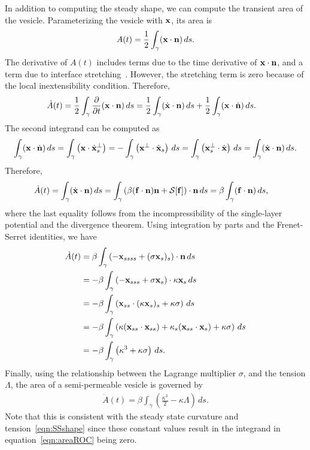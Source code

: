 \documentclass[aps,prl,showpacs]{revtex4}
\begin{document}
In addition to computing the steady shape, we can compute the transient
area of the vesicle. Parameterizing the vesicle with $\mathbf{x}$, its area is
\begin{align}
  A(t) = \frac{1}{2}\int_{\gamma} (\mathbf{x} \cdot \mathbf{n})\, ds .
\end{align}
The derivative of $A(t)$ includes terms due to the time derivative of
$\mathbf{x} \cdot \mathbf{n}$, and a term due to interface
stretching~\cite{lai-tse-hua2008}. However, the stretching term is zero
because of the local inextensibility condition. Therefore,
\begin{align}
  \dot{A}(t) &= \frac{1}{2} \int_{\gamma} \frac{\partial }{\partial t} 
    (\mathbf{x} \cdot \mathbf{n}) \, ds = 
  \frac{1}{2} \int_{\gamma} (\dot{\mathbf{x}} \cdot \mathbf{n})\, ds  + 
  \frac{1}{2} \int_{\gamma} (\mathbf{x} \cdot \dot{\mathbf{n}})\, ds.
\end{align}
The second integrand can be computed as
\begin{align}
  \int_\gamma (\mathbf{x} \cdot \dot{\mathbf{n}})\, ds 
    = \int_\gamma \left(\mathbf{x} \cdot \dot{\mathbf{x}}_s^\perp \right)
    = -\int_\gamma \left(\mathbf{x}^\perp \cdot \dot{\mathbf{x}}_s\right)\, ds 
    = \int_\gamma \left(\mathbf{x}_s^\perp \cdot \dot{\mathbf{x}}\right)\, ds 
    = \int_\gamma (\dot{\mathbf{x}} \cdot \mathbf{n})\, ds.
\end{align}
Therefore,
\begin{align}
  \dot{A}(t) &= \int_\gamma (\dot{\mathbf{x}} \cdot \mathbf{n})\, ds 
  = \int_\gamma \left(\beta (\mathbf{f} \cdot \mathbf{n})\mathbf{n} + \mathcal{S}[\mathbf{f}]\right) 
      \cdot \mathbf{n}\, ds 
  = \beta \int_\gamma (\mathbf{f} \cdot \mathbf{n})\, ds,
\end{align}
where the last equality follows from the incompressibility of the
single-layer potential and the divergence theorem.  Using integration by
parts and the Frenet-Serret identities, we have
\begin{align}
  \dot{A}(t) &= \beta \int_\gamma \left( -\mathbf{x}_{ssss} + 
    (\sigma \mathbf{x}_s)_s \right) \cdot \mathbf{n} \, ds \\
  &= -\beta \int_\gamma \left(-\mathbf{x}_{sss} + \sigma \mathbf{x}_s 
    \right) \cdot \kappa \mathbf{x}_s \, ds \\
  &= -\beta \int_\gamma \left(\mathbf{x}_{ss} \cdot 
    (\kappa \mathbf{x}_s)_s + \kappa \sigma \right) \, ds \\
  &= -\beta \int_\gamma \left(\kappa (\mathbf{x}_{ss} \cdot \mathbf{x}_{ss}) + 
    \kappa_s (\mathbf{x}_{ss} \cdot \mathbf{x}_s) + \kappa \sigma \right) 
    \, ds \\
  &= -\beta \int_\gamma \left(\kappa^3 + \kappa \sigma \right) 
    \, ds.
\end{align}
Finally, using the relationship between the Lagrange multiplier
$\sigma$, and the tension $\Lambda$, the area of a semi-permeable
vesicle is governed by
\begin{align}
  \dot{A}(t) = \beta \int_\gamma \left(
    \frac{\kappa^3}{2} - \kappa \Lambda \right) \, ds.
  \label{eqn:areaROC}
\end{align}
Note that this is consistent with the steady state curvature and
tension~\eqref{eqn:SSshape} since these constant values result in the
integrand in equation~\eqref{eqn:areaROC} being zero.
\end{document}
